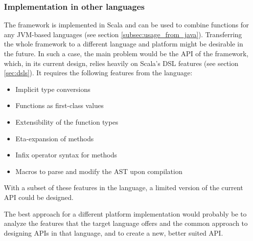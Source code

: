 \subsubsection{Implementation in other languages}

The framework is implemented in Scala and can be used to combine functions for any JVM-based languages (see section \ref{subsec:usage_from_java}). Transferring the whole framework to a different language and platform might be desirable in the future. In such a case, the main problem would be the API of the framework, which, in its current design, relies heavily on Scala's DSL features (see section \ref{sec:dsls}). It requires the following features from the language:

\begin{itemize}
	\item Implicit type conversions
	\item Functions as first-class values
	\item Extensibility of the function types
	\item Eta-expansion of methods
	\item Infix operator syntax for methods
	\item Macros to parse and modify the AST upon compilation
\end{itemize}

With a subset of these features in the language, a limited version of the current API could be designed. 

The best approach for a different platform implementation would probably be to analyze the features that the target language offers and the common approach to designing APIs in that language, and to create a new, better suited API.
